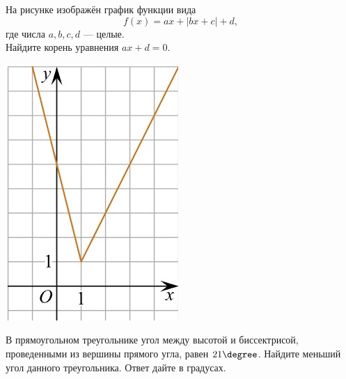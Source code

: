 \begin{class}[number=5]
\begin{listofex}
\begin{minipage}[t]{\picwidth}
		\end{minipage}
		\item
		\begin{minipage}[t]{\bodywidth}
			На рисунке изображён график функции вида \[ f(x)=ax+|bx+c|+d, \] где числа \(a, b, c, d\) --- целые.\\ Найдите корень уравнения \(ax+d=0\).
		\end{minipage}
		\hspace{0.05\linewidth}
		\begin{minipage}[t]{\picwidth}
			\includegraphics[align=t, width=\linewidth]{pics/G101M4C5-6.jpg}
		\end{minipage}
		\item В прямоугольном треугольнике угол между высотой и биссектрисой, проведенными из вершины прямого угла, равен \( 21\degree \). Найдите меньший угол данного треугольника. Ответ дайте в градусах.

\end{listofex}
\end{class}

